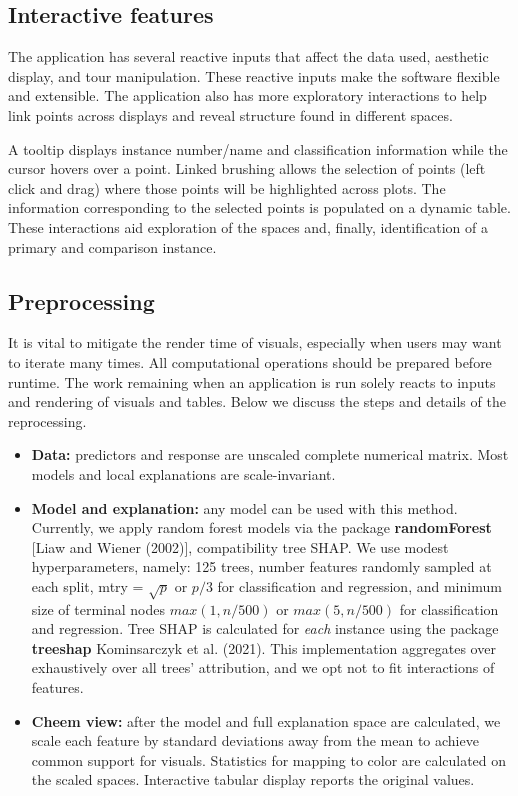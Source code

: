 \documentclass[
]{article}
\begin{document}
\hypertarget{interactive-features}{%
\subsection{Interactive features}\label{interactive-features}}

The application has several reactive inputs that affect the data used, aesthetic display, and tour manipulation. These reactive inputs make the software flexible and extensible. The application also has more exploratory interactions to help link points across displays and reveal structure found in different spaces.

A tooltip displays instance number/name and classification information while the cursor hovers over a point. Linked brushing allows the selection of points (left click and drag) where those points will be highlighted across plots. The information corresponding to the selected points is populated on a dynamic table. These interactions aid exploration of the spaces and, finally, identification of a primary and comparison instance.

\hypertarget{preprocessing}{%
\subsection{Preprocessing}\label{preprocessing}}

It is vital to mitigate the render time of visuals, especially when users may want to iterate many times. All computational operations should be prepared before runtime. The work remaining when an application is run solely reacts to inputs and rendering of visuals and tables. Below we discuss the steps and details of the reprocessing.




\begin{itemize}
    \item \textbf{Data:} predictors and response are unscaled complete numerical matrix. Most models and local explanations are scale-invariant.
    \item \textbf{Model and explanation:} any model can be used with this method. Currently, we apply random forest models via the package \textbf{randomForest} [Liaw and Wiener (2002)], compatibility tree SHAP. We use modest hyperparameters, namely: 125 trees, number features randomly sampled at each split, mtry = $\sqrt{p}$ or $p/3$ for classification and regression, and minimum size of terminal nodes $max(1, n/500)$ or $max(5, n/500)$ for classification and regression. Tree SHAP is calculated for \emph{each} instance using the package \textbf{treeshap} Kominsarczyk et al. (2021). This implementation aggregates over exhaustively over all trees' attribution, and we opt not to fit interactions of features. 
    \item \textbf{Cheem view:} after the model and full explanation space are calculated, we scale each feature by standard deviations away from the mean to achieve common support for visuals. Statistics for mapping to color are calculated on the scaled spaces. Interactive tabular display reports the original values.
\end{itemize}
\end{document}
